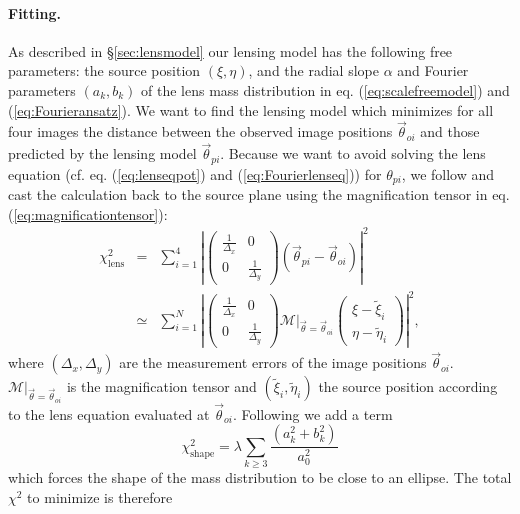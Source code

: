 \paragraph{Fitting.} As described in \S\ref{sec:lensmodel} our lensing model has the following free parameters: the source position $(\xi,\eta)$, and the radial slope $\alpha$ and Fourier parameters $(a_k,b_k)$ of the lens mass distribution in eq. (\ref{eq:scalefreemodel}) and (\ref{eq:Fourieransatz}). We want to find the lensing model which minimizes for all four images the distance between the observed image positions $\vec{\theta}_{oi}$ and those predicted by the lensing model $\vec{\theta}_{pi}$. Because we want to avoid solving the lens equation (cf. eq. (\ref{eq:lenseqpot}) and (\ref{eq:Fourierlenseq})) for $\theta_{pi}$, we follow \citet{1991ApJ...373..354K} and cast the calculation back to the source plane using the magnification tensor in eq. (\ref{eq:magnificationtensor}):
\begin{eqnarray*}
\chi^2_\text{lens} &=& \sum_{i=1}^{4} \left|\left( \begin{matrix} \frac{1}{\Delta_x} & 0\\0 & \frac{1}{\Delta_y}\end{matrix}\right) \left( \vec{\theta}_{pi} - \vec{\theta}_{oi} \right)\right|^2\\
&\simeq& \sum_{i=1}^{N} \left|\left( \begin{matrix} \frac{1}{\Delta_x} & 0\\0 & \frac{1}{\Delta_y}\end{matrix}\right)  \left.\mathscr{M}\right|_{\vec{\theta}=\vec{\theta}_{oi}} \left( \begin{matrix} \xi - \tilde{\xi}_i \\ \eta - \tilde{\eta}_i \end{matrix} \right) \right|^2,
\end{eqnarray*}
where $(\Delta_x,\Delta_y)$ are the measurement errors of the image positions $\vec{\theta}_{oi}$. $\left.\mathscr{M}\right|_{\vec{\theta}=\vec{\theta}_{oi}}$ is the magnification tensor and $(\tilde{\xi}_i,\tilde{\eta}_i)$ the source position according to the lens equation evaluated at $\vec{\theta}_{oi}$. Following \citet{GlennEC} we add a term
\begin{equation*}
\chi^2_\text{shape} = \lambda \sum_{k \geq 3} \frac{\left(a_k^2 +b_k^2 \right)}{a_0^2} 
\end{equation*}
which forces the shape of the mass distribution to be close to an ellipse. The total $\chi^2$ to minimize is therefore
